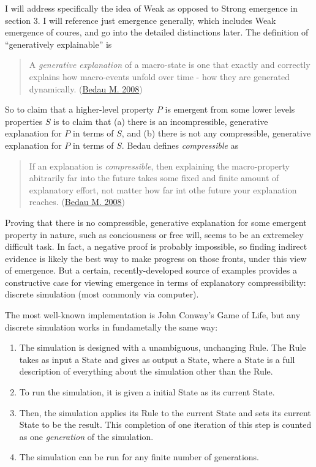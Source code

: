 \documentclass{article}
\newcommand{\ti}[1]{\textit{#1}}
\renewcommand{\cite}[1]{\hyperlink{#1}{#1}}
\begin{document}
I will address specifically the idea of Weak as opposed to Strong emergence in section 3. 
I will reference just emergence generally, which includes Weak emergence of coures, and go into the detailed distinctions later. The definition of ``generatively explainable'' is

\begin{quote}
A \ti{generative explanation} of a macro-state is one that exactly and correctly explains how macro-events unfold over time - how they are generated dynamically.
(\cite{Bedau M. 2008})
\end{quote}

So to claim that a higher-level property $P$ is emergent from some lower levels properties $S$ is to claim that (a) there is an incompressible, generative explanation for $P$ in terms of $S$, and (b) there is not any compressible, generative explanation for $P$ in terms of $S$. Bedau defines \ti{compressible} as

\begin{quote}
If an explanation is \ti{compressible}, then explaining the macro-property abitrarily far into the future takes some fixed and finite amount of explanatory effort, not matter how far int othe future your explanation reaches.
(\cite{Bedau M. 2008})
\end{quote}

Proving that there is no compressible, generative explanation for some emergent property in nature, such as conciousness or free will, seems to be an extremeley difficult task. In fact, a negative proof is probably impossible, so finding indirect evidence is likely the best way to make progress on those fronts, under this view of emergence. But a certain, recently-developed source of examples provides a constructive case for viewing emergence in terms of explanatory compressibility: discrete simulation (most commonly via computer).



The most well-known implementation is John Conway's Game of Life, but any discrete simulation works in fundametally the same way:

\begin{enumerate}
\item The simulation is designed with a unambiguous, unchanging Rule. The Rule takes as input a State and gives as output a State, where a State is a full description of everything about the simulation other than the Rule.
\item To run the simulation, it is given a initial State as its current State.
\item Then, the simulation applies its Rule to the current State and sets its current State to be the result. This completion of one iteration of this step is counted as one \ti{generation} of the simulation.
\item The simulation can be run for any finite number of generations.
\end{enumerate}
\end{document}

